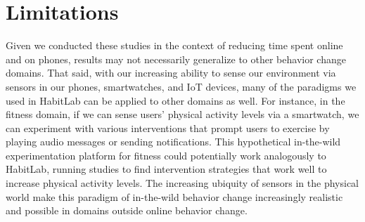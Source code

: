 
\section{Limitations}

Given we conducted these studies in the context of reducing time spent online and on phones, results may not necessarily generalize to other behavior change domains. That said, with our increasing ability to sense our environment via sensors in our phones, smartwatches, and IoT devices, many of the paradigms we used in HabitLab can be applied to other domains as well. For instance, in the fitness domain, if we can sense users' physical activity levels via a smartwatch, we can experiment with various interventions that prompt users to exercise by playing audio messages or sending notifications. This hypothetical in-the-wild experimentation platform for fitness could potentially work analogously to HabitLab, running studies to find intervention strategies that work well to increase physical activity levels. The increasing ubiquity of sensors in the physical world make this paradigm of in-the-wild behavior change increasingly realistic and possible in domains outside online behavior change.

